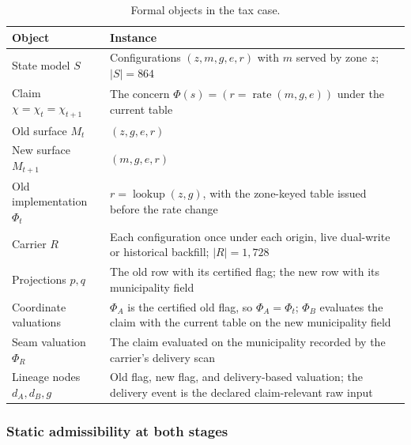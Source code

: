 \documentclass[smallextended,envcountsect,envcountsame,natbib]{svjour3}
\begin{document}
\begin{table}[htbp]
\centering
\small
\caption{Formal objects in the tax case.}
\label{ex:tab:instantiation}
\begin{tabularx}{\textwidth}{@{}p{3.3cm}L@{}}
\toprule
Object & Instance \\
\midrule
State model $S$ & Configurations $(z,m,g,e,r)$ with $m$ served by zone $z$; $|S|=864$ \\
Claim $\chi=\chi_t=\chi_{t+1}$ & The concern $\Phi(s)=(r=\operatorname{rate}(m,g,e))$ under the current table \\
Old surface $M_t$ & $(z,g,e,r)$ \\
New surface $M_{t+1}$ & $(m,g,e,r)$ \\
Old implementation $\Phi_t$ & $r=\operatorname{lookup}(z,g)$, with the zone-keyed table issued before the rate change \\
Carrier $R$ & Each configuration once under each origin, live dual-write or historical backfill; $|R|=1{,}728$ \\
Projections $p,q$ & The old row with its certified flag; the new row with its municipality field \\
Coordinate valuations & $\Phi_A$ is the certified old flag, so $\Phi_A=\Phi_t$; $\Phi_B$ evaluates the claim with the current table on the new municipality field \\
Seam valuation $\Phi_R$ & The claim evaluated on the municipality recorded by the carrier's delivery scan \\
Lineage nodes $d_A,d_B,g$ & Old flag, new flag, and delivery-based valuation; the delivery event is the declared claim-relevant raw input \\
\bottomrule
\end{tabularx}
\end{table}

\subsubsection{Static admissibility at both stages}
\end{document}
